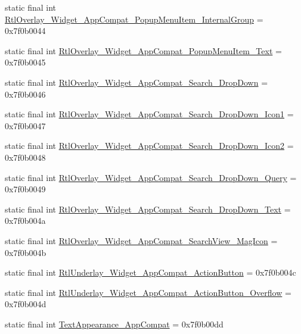 \begin{CompactItemize}
\item 
static final int \hyperlink{classandroid_1_1support_1_1v7_1_1appcompat_1_1_r_1_1style_2be68d41e7f3147f8d7f48abe6e4bfd6}{RtlOverlay\_\-Widget\_\-AppCompat\_\-PopupMenuItem\_\-InternalGroup} = 0x7f0b0044
\item 
static final int \hyperlink{classandroid_1_1support_1_1v7_1_1appcompat_1_1_r_1_1style_391939b0e80dd05b53f98417907873af}{RtlOverlay\_\-Widget\_\-AppCompat\_\-PopupMenuItem\_\-Text} = 0x7f0b0045
\item 
static final int \hyperlink{classandroid_1_1support_1_1v7_1_1appcompat_1_1_r_1_1style_c54d2fc11228c4b49d87edb8238179fd}{RtlOverlay\_\-Widget\_\-AppCompat\_\-Search\_\-DropDown} = 0x7f0b0046
\item 
static final int \hyperlink{classandroid_1_1support_1_1v7_1_1appcompat_1_1_r_1_1style_a78e3879022d94c14ed9e48eb16c636f}{RtlOverlay\_\-Widget\_\-AppCompat\_\-Search\_\-DropDown\_\-Icon1} = 0x7f0b0047
\item 
static final int \hyperlink{classandroid_1_1support_1_1v7_1_1appcompat_1_1_r_1_1style_f97482fbeec6b7cde630dd9082032a83}{RtlOverlay\_\-Widget\_\-AppCompat\_\-Search\_\-DropDown\_\-Icon2} = 0x7f0b0048
\item 
static final int \hyperlink{classandroid_1_1support_1_1v7_1_1appcompat_1_1_r_1_1style_3f1cd87910e5190b8d67bddb9f2dd138}{RtlOverlay\_\-Widget\_\-AppCompat\_\-Search\_\-DropDown\_\-Query} = 0x7f0b0049
\item 
static final int \hyperlink{classandroid_1_1support_1_1v7_1_1appcompat_1_1_r_1_1style_33f2ec7fdbfd8211e81896869d491866}{RtlOverlay\_\-Widget\_\-AppCompat\_\-Search\_\-DropDown\_\-Text} = 0x7f0b004a
\item 
static final int \hyperlink{classandroid_1_1support_1_1v7_1_1appcompat_1_1_r_1_1style_cea94550f9c61221974118f377a98003}{RtlOverlay\_\-Widget\_\-AppCompat\_\-SearchView\_\-MagIcon} = 0x7f0b004b
\item 
static final int \hyperlink{classandroid_1_1support_1_1v7_1_1appcompat_1_1_r_1_1style_8bd2394a4ec2ac8eac9b55e22b9f58df}{RtlUnderlay\_\-Widget\_\-AppCompat\_\-ActionButton} = 0x7f0b004c
\item 
static final int \hyperlink{classandroid_1_1support_1_1v7_1_1appcompat_1_1_r_1_1style_a69d40ceb10014e55a583898df1bdafd}{RtlUnderlay\_\-Widget\_\-AppCompat\_\-ActionButton\_\-Overflow} = 0x7f0b004d
\item 
static final int \hyperlink{classandroid_1_1support_1_1v7_1_1appcompat_1_1_r_1_1style_1755e39fb6cb90df0e9d5f91459e5761}{TextAppearance\_\-AppCompat} = 0x7f0b00dd

\end{CompactItemize}
